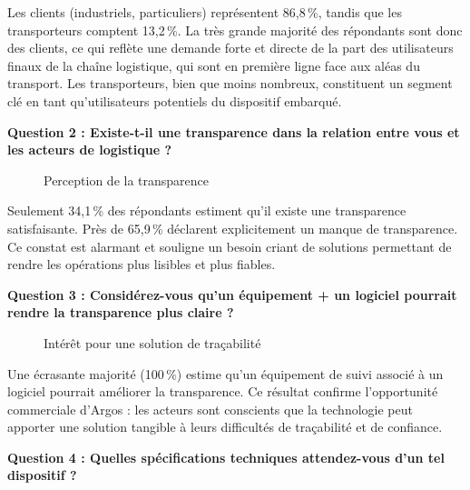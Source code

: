 Les clients (industriels, particuliers) représentent 86,8\,\%, tandis que les transporteurs comptent 13,2\,\%. La très grande majorité des répondants sont donc des clients, ce qui reflète une demande forte et directe de la part des utilisateurs finaux de la chaîne logistique, qui sont en première ligne face aux aléas du transport. Les transporteurs, bien que moins nombreux, constituent un segment clé en tant qu’utilisateurs potentiels du dispositif embarqué.

\textbf{Question 2 : Existe-t-il une transparence dans la relation entre vous et les acteurs de logistique ?}

\begin{figure}[H]
	\centering
	\shorthandoff{:}
	\shorthandon{:}
	\caption{Perception de la transparence}
	\label{fig:transparence}
    \tablesourcepromoteurs

\end{figure}

Seulement 34,1\,\% des répondants estiment qu’il existe une transparence satisfaisante. Près de 65,9\,\% déclarent explicitement un manque de transparence. Ce constat est alarmant et souligne un besoin criant de solutions permettant de rendre les opérations plus lisibles et plus fiables.

\textbf{Question 3 : Considérez-vous qu’un équipement + un logiciel pourrait rendre la transparence plus claire ?}

\begin{figure}[H]
	\centering
	\shorthandoff{:}
	\shorthandon{:}
	\caption{Intérêt pour une solution de traçabilité}
	\label{fig:interet}
    \tablesourcepromoteurs

\end{figure}

Une écrasante majorité (100\,\%) estime qu’un équipement de suivi associé à un logiciel pourrait améliorer la transparence. Ce résultat confirme l’opportunité commerciale d’Argos : les acteurs sont conscients que la technologie peut apporter une solution tangible à leurs difficultés de traçabilité et de confiance.

\textbf{Question 4 : Quelles spécifications techniques attendez-vous d’un tel dispositif ?}


